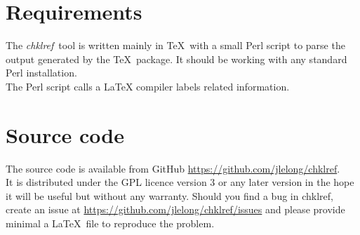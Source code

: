 \documentclass[a4paper,11pt,twoside]{article}
\def\chk{{\it chklref}}
\begin{document}
\section{Requirements}

The \chk\ tool is written mainly in \TeX\ with a small Perl script to parse the output generated by the \TeX\ package. It should be working with any standard Perl installation. \\

The Perl script calls a LaTeX compiler labels related information.

\section{Source code}

The source code is available from GitHub \url{https://github.com/jlelong/chklref}. \\

It is distributed under the GPL licence version 3 or any later version in the hope it will be useful but without any warranty. Should you find a bug in chklref, create an issue at \url{https://github.com/jlelong/chklref/issues} and please provide minimal a \LaTeX\ file to reproduce the problem.
\end{document}
